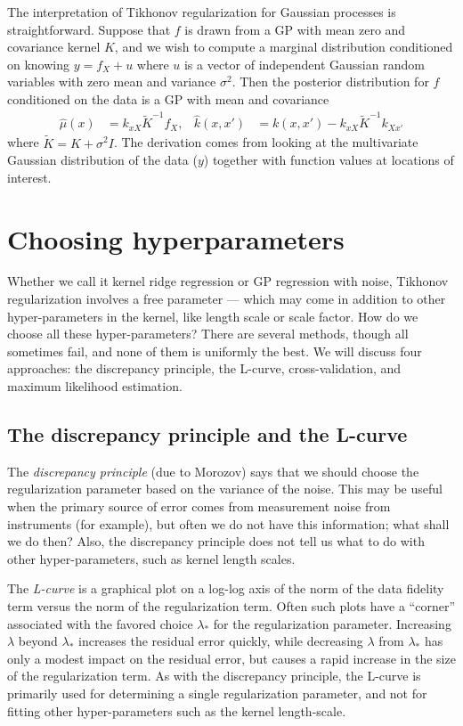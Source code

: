 \documentclass[12pt, leqno]{article} %
\begin{document}
The interpretation of Tikhonov regularization for Gaussian processes
is straightforward.  Suppose that $f$ is drawn from a GP with mean
zero and covariance kernel $K$, and we wish to compute a marginal
distribution conditioned on knowing $y = f_X + u$ where
$u$ is a vector of independent Gaussian random variables with zero
mean and variance $\sigma^2$.  Then the posterior distribution
for $f$ conditioned on the data is a GP with mean and covariance
\begin{align*}
  \hat{\mu}(x) &= k_{xX} \tilde{K}^{-1} f_X, &
  \hat{k}(x,x') &= k(x,x') - k_{xX} \tilde{K}^{-1} k_{Xx'}
\end{align*}
where $\tilde{K} = K + \sigma^2 I$.  The derivation comes from looking
at the multivariate Gaussian distribution of the data ($y$) together
with function values at locations of interest.

\section{Choosing hyperparameters}

Whether we call it kernel ridge regression or GP regression with
noise, Tikhonov regularization involves a free parameter --- which may
come in addition to other hyper-parameters in the kernel, like length
scale or scale factor.  How do we choose all these hyper-parameters?
There are several methods, though all sometimes fail, and none of
them is uniformly the best.  We will discuss four approaches:
the discrepancy principle, the L-curve, cross-validation, and maximum
likelihood estimation.

\subsection{The discrepancy principle and the L-curve}

The {\em discrepancy principle} (due to Morozov) says that we should
choose the regularization parameter based on the variance of the
noise.  This may be useful when the primary source of error comes from
measurement noise from instruments (for example), but often we do not
have this information; what shall we do then?  Also, the discrepancy
principle does not tell us what to do with other hyper-parameters,
such as kernel length scales.

The {\em L-curve} is a graphical plot on a log-log axis of the norm of
the data fidelity term versus the norm of the regularization term.
Often such plots have a ``corner'' associated with the favored choice
$\lambda_*$ for the regularization parameter.  Increasing $\lambda$
beyond $\lambda_*$ increases the residual error quickly, while
decreasing $\lambda$ from $\lambda_*$ has only a modest impact on the
residual error, but causes a rapid increase in the size of the
regularization term.  As with the discrepancy principle, the L-curve
is primarily used for determining a single regularization parameter,
and not for fitting other hyper-parameters such as the kernel
length-scale.
\end{document}
